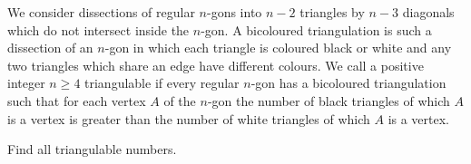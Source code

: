 We consider dissections of regular $n$-gons into $n - 2$ triangles by $n - 3$ diagonals which do not intersect inside the $n$-gon. A bicoloured triangulation is such a dissection of an $n$-gon in which each triangle is coloured black or white and any two triangles which share an edge have different colours. We call a positive integer $n \ge 4$ triangulable if every regular $n$-gon has a bicoloured triangulation such that for each vertex $A$ of the $n$-gon the number of black triangles of which $A$ is a vertex is greater than the number of white triangles of which $A$ is a vertex.

Find all triangulable numbers.